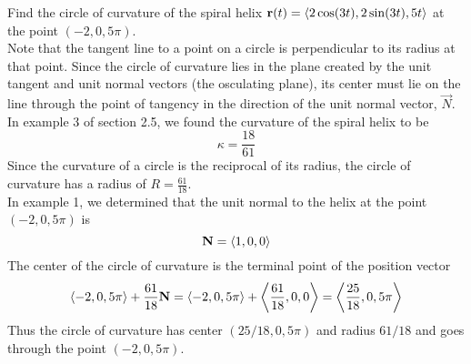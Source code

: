 \documentclass[handout]{ximera}
\begin{document}
\begin{example}[Example 4]
Find the circle of curvature of the spiral helix $\mathbf r(t) =  \left\langle 2\cos(3t), 2\sin(3t), 5t\right\rangle$ at the point $(-2, 0, 5\pi)$.\\

Note that the tangent line to a point on a circle is perpendicular to its radius at that point. 
Since the circle of curvature lies in the plane created by the unit tangent and unit normal vectors (the osculating plane),
its center must lie on the line through the point of tangency in the direction of the unit normal vector, $\vec N$.\\

In example 3 of section 2.5, we found the curvature of the spiral helix to be 
\[
\kappa = \frac{18}{61}
\]
Since the curvature of a circle is the reciprocal of its radius, the circle of curvature has a radius of $R = \frac{61}{18}$.\\

In example 1, we determined that the unit normal to the helix at the point $(-2, 0, 5\pi)$ is
\[
\mathbf N = \left\langle 1, 0, 0\right\rangle
\]
The center of the circle of curvature is the terminal point of the position vector 
\[
\left\langle -2, 0, 5\pi\right\rangle + \frac{61}{18}\mathbf N = \left\langle -2, 0, 5\pi\right\rangle + \left\langle \frac{61}{18}, 0, 0\right\rangle = \left\langle \frac{25}{18} , 0, 5\pi\right\rangle
\]
Thus the circle of curvature has center $(25/18, 0, 5\pi)$ and radius $61/18$ and goes through the point $(-2, 0, 5\pi)$.
\end{example}
\end{document}
